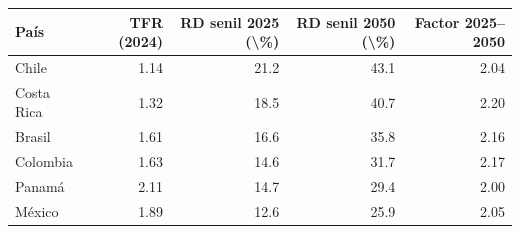
\begin{tabular}{lrrrr}
\toprule
País & TFR (2024) & RD senil 2025 (\textbackslash{}\%) & RD senil 2050 (\textbackslash{}\%) & Factor 2025--2050\\
\midrule
Chile & 1.14 & 21.2 & 43.1 & 2.04\\
Costa Rica & 1.32 & 18.5 & 40.7 & 2.20\\
Brasil & 1.61 & 16.6 & 35.8 & 2.16\\
Colombia & 1.63 & 14.6 & 31.7 & 2.17\\
Panamá & 2.11 & 14.7 & 29.4 & 2.00\\
México & 1.89 & 12.6 & 25.9 & 2.05\\
\bottomrule
\end{tabular}